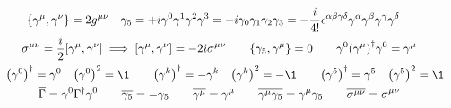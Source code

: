 \begin{gather*}
        \acomm{\gamma^\mu}{\gamma^\nu} = 2g^{\mu\nu}
        \quad
        \gamma_5
        = +i\gamma^0\gamma^1\gamma^2\gamma^3
        = -i\gamma_0\gamma_1\gamma_2\gamma_3
        = -\frac{i}{4!}\epsilon^{\alpha\beta\gamma\delta} \gamma^\alpha\gamma^\beta\gamma^\gamma\gamma^\delta
        \quad
        \\
        \sigma^{\mu\nu} = \frac{i}{2}\comm{\gamma^\mu}{\gamma^\nu}
        \implies \comm{\gamma^\mu}{\gamma^\nu} = -2i\sigma^{\mu\nu}
        \qquad
        \acomm{\gamma_5}{\gamma^\mu} = 0
        \qquad
        \gamma^0\qty(\gamma^\mu)^\dagger\gamma^0 = \gamma^\mu
        \\
        \quad
        \qty(\gamma^0)^\dagger = \gamma^0
        \quad
        \qty(\gamma^0)^2 = \1
        \qquad
        \qty(\gamma^k)^\dagger = -\gamma^k
        \quad
        \qty(\gamma^k)^2 = -\1
        \qquad
        \qty(\gamma^5)^\dagger = \gamma^5
        \quad
        \qty(\gamma^5)^2 = \1
        \\
        \overline{\Gamma} = \gamma^0\Gamma^\dagger\gamma^0
        \qquad
        \overline{\gamma_5} = -\gamma_5
        \qquad
        \overline{\gamma^\mu} = \gamma^\mu
        \qquad
        \overline{\gamma^\mu\gamma_5} = \gamma^\mu\gamma_5
        \qquad
        \overline{\sigma^{\mu\nu}} = \sigma^{\mu\nu}
\end{gather*}

